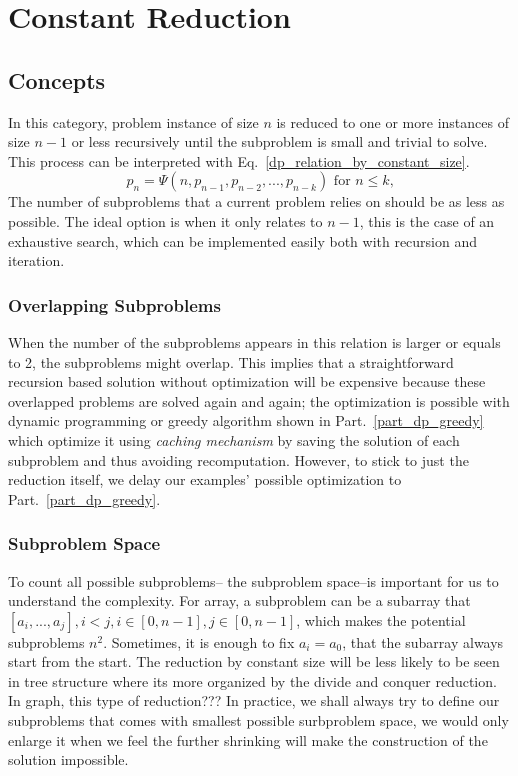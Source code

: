 \documentclass[../main.tex]{subfiles}
\begin{document}
\section{Constant Reduction}
\label{chapter_reduce_conquer_constant_size}
\subsection{Concepts}
In this category, problem instance of size $n$ is reduced to one or more instances of size $n-1$ or less recursively until the subproblem is small and trivial to solve. This process can be interpreted with Eq.~\ref{dp_relation_by_constant_size}.
    \begin{equation}
    p_n = \Psi(n, p_{n-1}, p_{n-2}, ..., p_{n-k})  \text{ for $n \leq k$,}
    \label{dp_relation_by_constant_size}
    \end{equation}
The number of subproblems that a current problem relies on should be as less as possible. The ideal option is when it only relates to  $n-1$, this is the case of an exhaustive search, which can be implemented easily both with recursion and iteration. 

\subsubsection{Overlapping Subproblems} When the number of the subproblems appears in this relation is larger or equals to 2, the subproblems might overlap. This implies that a straightforward recursion based solution without optimization will be expensive because these overlapped problems are solved again and again; the optimization is possible with dynamic programming or greedy algorithm shown in Part.~\ref{part_dp_greedy} which optimize it using \textit{caching mechanism} by saving the solution of each subproblem and thus avoiding recomputation. However, to stick to just the reduction itself, we delay our examples' possible optimization to Part.~\ref{part_dp_greedy}.

\subsubsection{Subproblem Space} To count all possible subproblems-- the subproblem space--is important for us to understand the complexity. For array, a subproblem can be a subarray that $[a_i,...,a_j], i<j, i\in[0,n-1], j\in[0,n-1]$, which makes the potential subproblems $n^2$. Sometimes, it is enough to fix $a_i=a_0$, that the subarray always start from the start. The reduction by constant size will be less likely to be seen in tree structure where its more organized by the divide and conquer reduction. In graph, this type of reduction??? In practice, we shall always try to define our subproblems that comes with smallest possible surbproblem space, we would only enlarge it when we feel the further shrinking will make the construction of the solution impossible. 
\end{document}
